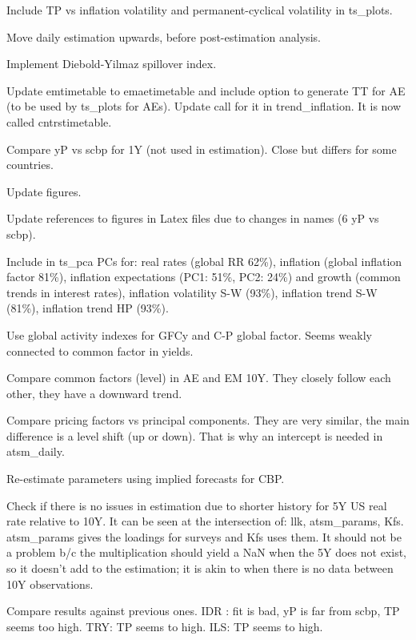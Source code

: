 \documentclass[12pt]{article}
\newcommand{\cmark}{\ding{51}}
\newcommand{\done}{\rlap{$\square$}{\raisebox{2pt}{\large\hspace{1pt}\cmark}}%
	\hspace{-2.5pt}}
\begin{document}
\begin{todolist}
\begin{todolist}
		\item[\done] Include TP vs inflation volatility and permanent-cyclical volatility in ts_plots.
		\item[\done] Move daily estimation upwards, before post-estimation analysis.
		\item[\done] Implement Diebold-Yilmaz spillover index.
		\item[\done] Update emtimetable to emaetimetable and include option to generate TT for AE (to be used by ts_plots for AEs). Update call for it in trend_inflation. It is now called cntrstimetable.
		\item[\done] Compare yP vs scbp for 1Y (not used in estimation). Close but differs for some countries.
		\item[\done] Update figures.
		\item[\done] Update references to figures in Latex files due to changes in names (6 yP vs scbp).
		\item[\done] Include in ts_pca PCs for: real rates (global RR 62\%), inflation (global inflation factor 81\%), inflation expectations (PC1: 51\%, PC2: 24\%) and growth (common trends in interest rates), inflation volatility S-W (93\%), inflation trend S-W (81\%), inflation trend HP (93\%).
		\item[\done] Use global activity indexes for GFCy and C-P global factor. Seems weakly connected to common factor in yields.
		\item[\done] Compare common factors (level) in AE and EM 10Y. They closely follow each other, they have a downward trend.
		\item[\done] Compare pricing factors vs principal components. They are very similar, the main difference is a level shift (up or down). That is why an intercept is needed in atsm_daily.
	\end{todolist}
	\item[\done] Re-estimate parameters using implied forecasts for CBP.
	\begin{todolist}
		\item[\done] Check if there is no issues in estimation due to shorter history for 5Y US real rate relative to 10Y. It can be seen at the intersection of: llk, atsm_params, Kfs. atsm_params gives the loadings for surveys and Kfs uses them. It should not be a problem b/c the multiplication should yield a NaN when the 5Y does not exist, so it doesn't add to the estimation; it is akin to when there is no data between 10Y observations.
		\item[\done] Compare results against previous ones. IDR : fit is bad, yP is far from scbp, TP seems too high. TRY: TP seems to high. ILS: TP seems to high.

\end{todolist}
\end{todolist}
\end{document}
